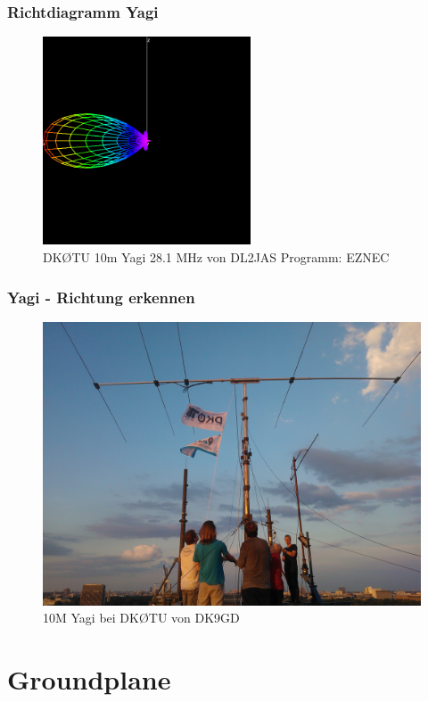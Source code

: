 \begin{frame}
  \frametitle{Richtdiagramm Yagi}
  \begin{center}
    \begin{figure}
      \includegraphics[width=0.55\textwidth,height=.75\textheight,keepaspectratio]{e11/yagi_gain.png}
      \caption{DK\O TU 10m Yagi 28.1 MHz von DL2JAS Programm: EZNEC}
    \end{figure}
  \end{center}
\end{frame}

\begin{frame}
  \frametitle{Yagi - Richtung erkennen}
  \begin{center}
    \begin{figure}
      \includegraphics[width=.75\textwidth,height=.75\textheight,keepaspectratio]{e11/yagi.jpg}
      \caption{10M Yagi bei DK\O TU von DK9GD}
    \end{figure}
  \end{center}
\end{frame}


\section*{Groundplane}

